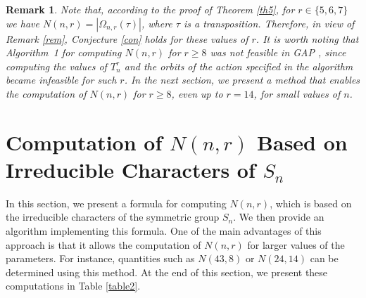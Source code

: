 \documentclass{amsart}
\newtheorem{rem}[thm]{Remark}
\numberwithin{equation}{section}
\begin{document}
\begin{rem}
Note that, according to the proof of Theorem \ref{th5}, for $r \in \{5,6,7\}$ we have 
$N(n,r) = |\Omega_{n,r}(\tau)|$, where $\tau$ is a transposition. Therefore, in view of 
Remark \ref{rem}, Conjecture \ref{con} holds for these values of $r$.
It is worth noting that Algorithm~1 for computing $N(n,r)$ for $r \geq 8$ was not 
feasible in GAP \cite{GAP}, since computing the values of $T_n^r$ and the orbits of 
the action specified in the algorithm became infeasible for such $r$. In the next section, 
we present a method that enables the computation of $N(n,r)$ for $r \geq 8$, 
even up to $r = 14$, for small values of $n$.
\end{rem}
\section{Computation of $N(n, r)$ Based on Irreducible Characters of $S_n$}
In this section, we present a formula for computing $N(n,r)$, which is based on the irreducible characters of the symmetric group $S_n$. We then provide an algorithm implementing this formula.  
One of the main advantages of this approach is that it allows the computation of $N(n,r)$ for larger values of the parameters. For instance, quantities such as $N(43,8)$ or $N(24,14)$ can be determined using this method. At the end of this section, we present these computations in Table \ref{table2}.  
\end{document}
